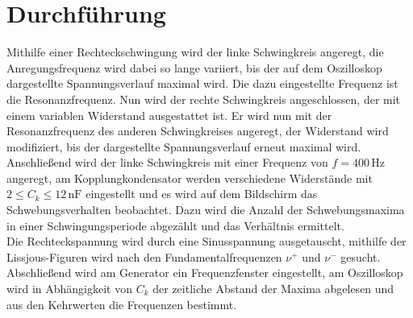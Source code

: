 \section{Durchführung}
\label{sec:Durchführung}
Mithilfe einer Rechteckschwingung wird der linke Schwingkreis angeregt, die Anregungsfrequenz wird dabei so lange variiert, bis der auf dem Oszilloskop dargestellte Spannungsverlauf maximal wird. Die dazu eingestellte
Frequenz ist die Resonanzfrequenz. Nun wird der rechte Schwingkreis angeschlossen, der mit einem variablen Widerstand ausgestattet ist. Er wird nun mit der Resonanzfrequenz des anderen Schwingkreises angeregt, der
Widerstand wird modifiziert, bis der dargestellte Spannungsverlauf erneut maximal wird. \\

Anschließend wird der linke Schwingkreis mit einer Frequenz von $f = 400 \, \unit{\hertz}$ angeregt, am Kopplungkondensator werden verschiedene Widerstände mit $2 \leq C_k \leq 12 \, \unit{\nano\farad}$ eingestellt und
es wird auf dem Bildschirm das Schwebungsverhalten beobachtet. Dazu wird die Anzahl der Schwebungsmaxima in einer Schwingungsperiode abgezählt und das Verhältnis ermittelt. \\

Die Rechteckspannung wird durch eine Sinusspannung ausgetauscht, mithilfe der Lissjous-Figuren wird nach den Fundamentalfrequenzen $ν^+$ und $ν^-$ gesucht. \\

Abschließend wird am Generator ein Frequenzfenster eingestellt, am Oszilloskop wird in Abhängigkeit von $C_k$ der zeitliche Abstand der Maxima abgelesen und aus den Kehrwerten die Frequenzen bestimmt.